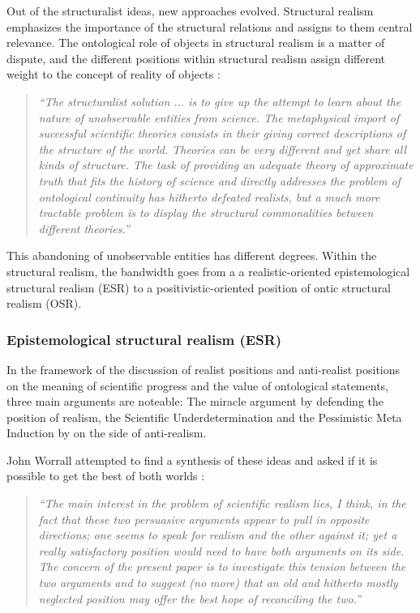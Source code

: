 \documentclass{article}
\begin{document}
Out of the structuralist ideas, new approaches evolved. Structural realism emphasizes the importance of the structural relations and assigns to them central relevance. The ontological role of objects in structural realism is a matter of dispute, and the different positions within structural realism assign different weight to the concept of reality of objects \cite[]{sep-structural-realism}:

\begin{quote}
\textit{``The structuralist solution ... is to give up the attempt to learn about the nature of unobservable entities from science. The metaphysical import of successful scientific theories consists in their giving correct descriptions of the structure of the world. Theories can be very different and yet share all kinds of structure. The task of providing an adequate theory of approximate truth that fits the history of science and directly addresses the problem of ontological continuity has hitherto defeated realists, but a much more tractable problem is to display the structural commonalities between different theories.''}
\end{quote}

This abandoning of unobservable entities has different degrees. Within the structural realism, the bandwidth goes from a a realistic-oriented epistemological structural realism (ESR) to a positivistic-oriented position of ontic structural realism (OSR).   

\newpage

\subsubsection{Epistemological structural realism (ESR) }

In the framework of the discussion of realist positions and anti-realist positions on the meaning of scientific progress and the value of ontological statements, three main arguments are noteable: The miracle argument by \cite[]{putnam1975mathematics} defending the position of realism, the Scientific Underdetermination \cite[]{sep-scientific-underdetermination} and the Pessimistic Meta Induction by \cite{laudan1981confutation} on the side of anti-realism. \newline

John Worrall attempted to find a synthesis of these ideas and asked if it is possible to get the best of both worlds \cite[p.101]{worrall1989structural}:

\begin{quote}
\textit{``The main interest in the problem of scientific realism lies, I think, in the fact that these two persuasive arguments appear to pull in opposite directions; one seems to speak for realism and the other against it; yet a really satisfactory position would need to have both arguments on its side. The concern of the present paper is to investigate this tension between the two arguments and to suggest (no more)
that an old and hitherto mostly neglected position may offer the best hope of
reconciling the two.''}
\end{quote}
\end{document}
